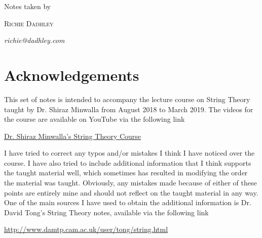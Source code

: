 \documentclass[11pt,oneside]{book}
\theoremstyle{definition} %
\theoremstyle{plain} %
\theoremstyle{remark} %
\theoremstyle{underline}
\begin{document}
\begin{titlepage}
	    Notes taken by 
	
	    \vspace{0.5\baselineskip} %
	
	    {\scshape\Large Richie Dadhley} %
	   
	    \vspace{0.5\baselineskip} %
	    \textit{richie@dadhley.com} %
	
	    \vfill %
\end{titlepage}




\newpage
\section*{Acknowledgements}

This set of notes is intended to accompany the lecture course on String Theory taught by Dr. Shiraz Minwalla from August 2018 to March 2019. The videos for the course are available on YouTube via the following link

\begin{center}
    \href{https://www.youtube.com/watch?v=96RaoTmBsTw&list=PL3PVFGnaPl_sCp2A87NVD8GT5Z8Oqw3Yr&index=1}{Dr. Shiraz Minwalla’s String Theory Course}
\end{center}

I have tried to correct any typos and/or mistakes I think I have noticed over the course. I have also tried to include additional information that I think supports the taught material well, which sometimes has resulted in modifying the order the material was taught. Obviously, any mistakes made because of either of these points are entirely mine and should not reflect on the taught material in any way. \\

One of the main sources I have used to obtain the additional information is Dr. David Tong’s String Theory notes, available via the following link

\begin{center}
    \href{http://www.damtp.cam.ac.uk/user/tong/string.html}{http://www.damtp.cam.ac.uk/user/tong/string.html}
\end{center}
\end{document}
